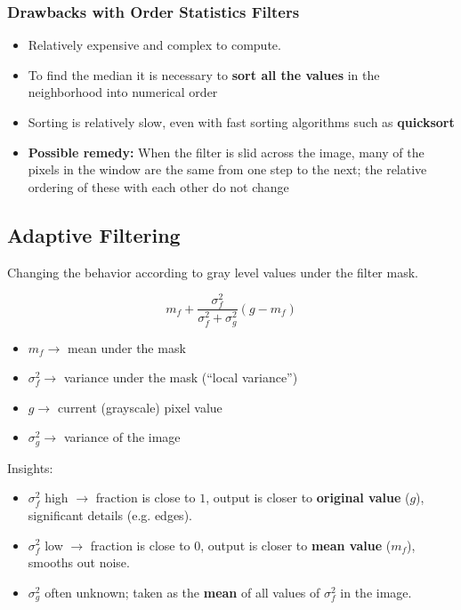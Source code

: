 \subsubsection*{Drawbacks with Order Statistics Filters}

\begin{itemize}
  \item Relatively expensive and complex to compute.
  \item To find the median it is necessary to \textbf{sort all the
    values} in the neighborhood into numerical order
  \item Sorting is relatively slow, even with fast sorting algorithms
    such as \textbf{quicksort}
  \item \textbf{Possible remedy:} When the filter is slid across the
    image, many of the pixels in the window are the same from one
    step to the next; the relative ordering of these with each other
    do not change
\end{itemize}

\subsection*{Adaptive Filtering}

Changing the behavior according to gray level values under the filter mask.

\begin{equation*}
  m_f + \frac{\sigma_f^2}{\sigma_f^2 + \sigma_g^2} (g - m_f)
\end{equation*}

\begin{itemize}
  \item $m_f \rightarrow$ mean under the mask
  \item $\sigma_f^2 \rightarrow$ variance under the mask
    (\enquote{local variance})
  \item $g \rightarrow$ current (grayscale) pixel value
  \item $\sigma_g^2 \rightarrow$ variance of the image
\end{itemize}

Insights:

\begin{itemize}
  \item $\sigma_f^2$ high $\rightarrow$ fraction is close to $1$,
    output is closer to \textbf{original value} ($g$), significant
    details (e.g. edges).

  \item $\sigma_f^2$ low $\rightarrow$ fraction is close to $0$,
    output is closer to \textbf{mean value} ($m_f$), smooths out noise.

  \item $\sigma_g^2$ often unknown; taken as the \textbf{mean} of all
    values of $\sigma_f^2$ in the image.
\end{itemize}


